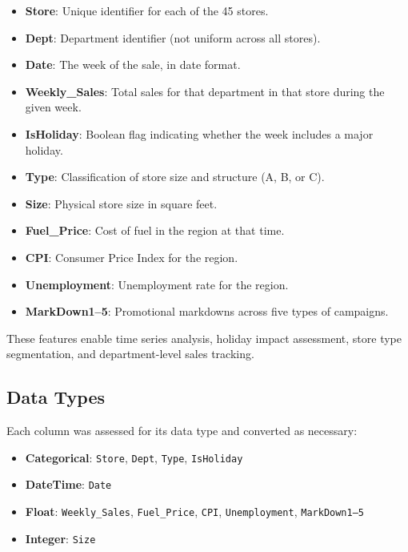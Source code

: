 \begin{itemize}
	\item \textbf{Store}: Unique identifier for each of the 45 stores.
	\item \textbf{Dept}: Department identifier (not uniform across all stores).
	\item \textbf{Date}: The week of the sale, in date format.
	\item \textbf{Weekly\_Sales}: Total sales for that department in that store during the given week.
	\item \textbf{IsHoliday}: Boolean flag indicating whether the week includes a major holiday.
	\item \textbf{Type}: Classification of store size and structure (A, B, or C).
	\item \textbf{Size}: Physical store size in square feet.
	\item \textbf{Fuel\_Price}: Cost of fuel in the region at that time.
	\item \textbf{CPI}: Consumer Price Index for the region.
	\item \textbf{Unemployment}: Unemployment rate for the region.
	\item \textbf{MarkDown1–5}: Promotional markdowns across five types of campaigns.
\end{itemize}



These features enable time series analysis, holiday impact assessment, store type segmentation, and department-level sales tracking.

\subsection{Data Types}

Each column was assessed for its data type and converted as necessary:

\begin{itemize}
	\item \textbf{Categorical}: \texttt{Store}, \texttt{Dept}, \texttt{Type}, \texttt{IsHoliday}
	\item \textbf{DateTime}: \texttt{Date}
	\item \textbf{Float}: \texttt{Weekly\_Sales}, \texttt{Fuel\_Price}, \texttt{CPI}, \texttt{Unemployment}, \texttt{MarkDown1–5}
	\item \textbf{Integer}: \texttt{Size}
\end{itemize}



